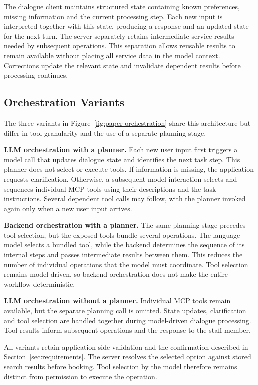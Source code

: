 The dialogue client maintains structured state containing known preferences, missing information and the current processing step.
Each new input is interpreted together with this state, producing a response and an updated state for the next turn.
The server separately retains intermediate service results needed by subsequent operations.
This separation allows reusable results to remain available without placing all service data in the model context.
Corrections update the relevant state and invalidate dependent results before processing continues.



\begin{strip}
    \begin{minipage}{\textwidth}
    \subsection{Orchestration Variants}
    The three variants in Figure~\ref{fig:paper-orchestration} share this architecture but differ in tool granularity and the use of a separate planning stage.
    \par\medskip
    \captionsetup{type=figure}
    
    \end{minipage}
\end{strip}

\textbf{LLM orchestration with a planner.}
Each new user input first triggers a model call that updates dialogue state and identifies the next task step.
This planner does not select or execute tools.
If information is missing, the application requests clarification.
Otherwise, a subsequent model interaction selects and sequences individual MCP tools using their descriptions and the task instructions.
Several dependent tool calls may follow, with the planner invoked again only when a new user input arrives.

\textbf{Backend orchestration with a planner.}
The same planning stage precedes tool selection, but the exposed tools bundle several operations.
The language model selects a bundled tool, while the backend determines the sequence of its internal steps and passes intermediate results between them.
This reduces the number of individual operations that the model must coordinate.
Tool selection remains model-driven, so backend orchestration does not make the entire workflow deterministic.

\textbf{LLM orchestration without a planner.}
Individual MCP tools remain available, but the separate planning call is omitted.
State updates, clarification and tool selection are handled together during model-driven dialogue processing.
Tool results inform subsequent operations and the response to the staff member.

All variants retain application-side validation and the confirmation described in Section~\ref{sec:requirements}.
The server resolves the selected option against stored search results before booking.
Tool selection by the model therefore remains distinct from permission to execute the operation.
